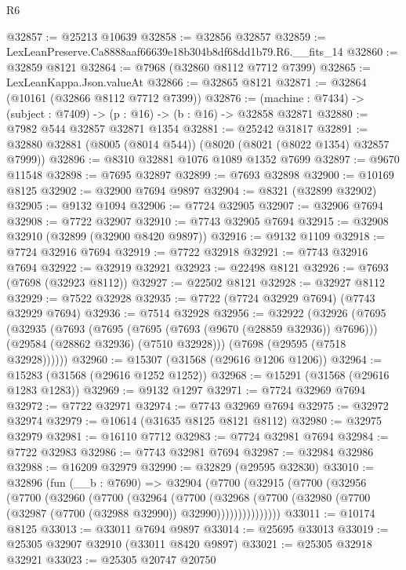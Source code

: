 \begin{lexlean}{R6}
\begin{coremodule}
@32857 := @25213 @10639
@32858 := @32856 @32857
@32859 := LexLeanPreserve.Ca8888aaf66639e18b304b8df68dd1b79.R6.__fits_14
@32860 := @32859 @8121
@32864 := @7968 (@32860 @8112 @7712 @7399)
@32865 := LexLeanKappa.Json.valueAt
@32866 := @32865 @8121
@32871 := @32864 (@10161 (@32866 @8112 @7712 @7399))
@32876 := (machine : @7434) -> (subject : @7409) -> (p : @16) -> (b : @16) -> @32858 @32871
@32880 := @7982 @544 @32857 @32871 @1354
@32881 := @25242 @31817
@32891 := @32880 @32881 (@8005 (@8014 @544)) (@8020 (@8021 (@8022 @1354) @32857 @7999))
@32896 := @8310 @32881 @1076 @1089 @1352 @7699
@32897 := @9670 @11548
@32898 := @7695 @32897
@32899 := @7693 @32898
@32900 := @10169 @8125
@32902 := @32900 @7694 @9897
@32904 := @8321 (@32899 @32902)
@32905 := @9132 @1094
@32906 := @7724 @32905
@32907 := @32906 @7694
@32908 := @7722 @32907
@32910 := @7743 @32905 @7694
@32915 := @32908 @32910 (@32899 (@32900 @8420 @9897))
@32916 := @9132 @1109
@32918 := @7724 @32916 @7694
@32919 := @7722 @32918
@32921 := @7743 @32916 @7694
@32922 := @32919 @32921
@32923 := @22498 @8121
@32926 := @7693 (@7698 (@32923 @8112))
@32927 := @22502 @8121
@32928 := @32927 @8112
@32929 := @7522 @32928
@32935 := @7722 (@7724 @32929 @7694) (@7743 @32929 @7694)
@32936 := @7514 @32928
@32956 := @32922
    (@32926
      (@7695
        (@32935
          (@7693
            (@7695 (@7695 (@7693 (@9670 (@28859 @32936)) @7696)))
            (@29584 (@28862 @32936) (@7510 @32928)))
          (@7698 (@29595 (@7518 @32928))))))
@32960 := @15307 (@31568 (@29616 @1206 @1206))
@32964 := @15283 (@31568 (@29616 @1252 @1252))
@32968 := @15291 (@31568 (@29616 @1283 @1283))
@32969 := @9132 @1297
@32971 := @7724 @32969 @7694
@32972 := @7722 @32971
@32974 := @7743 @32969 @7694
@32975 := @32972 @32974
@32979 := @10614 (@31635 @8125 @8121 @8112)
@32980 := @32975 @32979
@32981 := @16110 @7712
@32983 := @7724 @32981 @7694
@32984 := @7722 @32983
@32986 := @7743 @32981 @7694
@32987 := @32984 @32986
@32988 := @16209 @32979
@32990 := @32829 (@29595 @32830)
@33010 := @32896
    (fun (__b : @7690) =>
    @32904
      (@7700
        (@32915
          (@7700
            (@32956
              (@7700
                (@32960
                  (@7700
                    (@32964
                      (@7700
                        (@32968
                          (@7700
                            (@32980 (@7700 (@32987 (@7700 (@32988 @32990)) @32990)))))))))))))))
@33011 := @10174 @8125
@33013 := @33011 @7694 @9897
@33014 := @25695 @33013
@33019 := @25305 @32907 @32910 (@33011 @8420 @9897)
@33021 := @25305 @32918 @32921
@33023 := @25305 @20747 @20750

\end{coremodule}
\end{lexlean}
